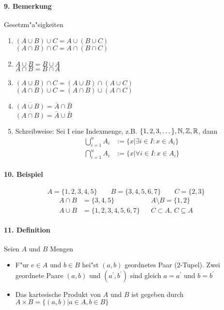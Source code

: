 \paragraph{9. Bemerkung} Gesetzm"a"sigkeiten
\begin{enumerate}[label=\alph*)]
	\item $(A\cup B)\cup C=A\cup(B\cup C)$\\
	$(A\cap B)\cap C=A\cap(B\cap C)$ 
	\item $A\cup B=B\cup A$\\
	$A\cap B=B\cap A$ 
	\item $(A\cup B)\cap C=(A\cup B)\cap(A\cup C)$\\
	$(A\cap B)\cup C=(A\cap B)\cup(A\cap C)$
	\item $\overline{(A\cup B)}=\bar A\cap\bar B$\\
	$\overline{(A\cap B)}=\bar A\cup\bar B$ 
	\item Schreibweise: Sei $\mathrm I$ eine Indexmenge, z.B. $\{1,2,3,\dots\}, \mathbb{N},\mathbb{Z},\mathbb{R}$, dann
	\begin{align*}
		\bigcup_{i=1}^nA_i&:=\{x|\exists i\in I:x\in A_i\}\\
		\bigcap_{i=1}^nA_i&:=\{x|\forall i\in I:x\in A_i\}
	\end{align*}
\end{enumerate}

\paragraph{10. Beispiel}
\[
A=\{1,2,3,4,5\}\qquad B=\{3,4,5,6,7\}\qquad C=\{2,3\}
\]
\begin{align*}
	A\cap B&=\{3,4,5\}&&A\setminus B=\{1,2\}\\
	A\cup B&=\{1,2,3,4,5,6,7\}&&C\subset A\text{, }C\subseteq A
\end{align*}

\paragraph{11. Definition} Seien $A$ und $B$ Mengen
\begin{itemize}
	\item F"ur $e\in A$ und $b\in B$ hei"st $(a,b)$ geordnetes Paar (2-Tupel). Zwei geordnete Paare $(a,b)$ und $(a^{'},b^{'})$ sind gleich \gdw $a=a^{'}$ und $b=b^{'}$
	\item Das kartesische Produkt von $A$ und $B$ ist gegeben durch $A\times B=\{(a,b)|a\in A, b\in B\}$
\end{itemize}

